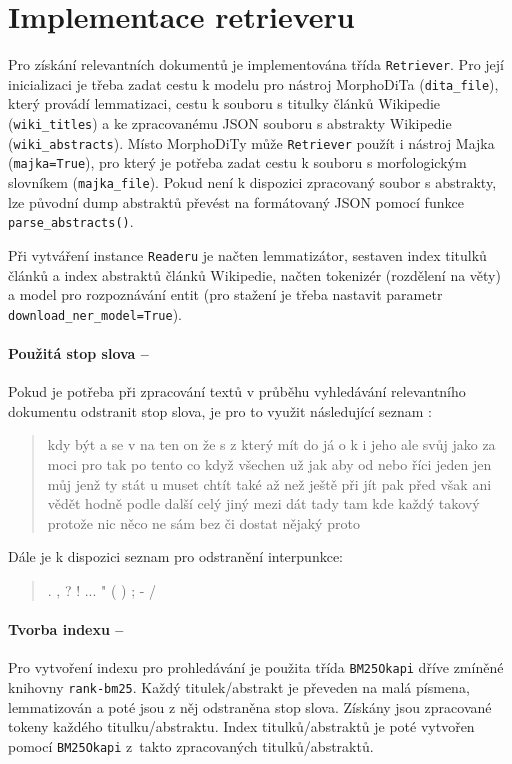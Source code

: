 \section{Implementace retrieveru}
\label{retriever_imp}
Pro získání relevantních dokumentů je implementována třída \texttt{Retriever}. Pro její inicializaci je třeba zadat cestu k modelu pro nástroj MorphoDiTa (\texttt{dita\_file}), který provádí lemmatizaci, cestu k souboru s titulky článků Wikipedie (\texttt{wiki\_titles}) a ke zpracovanému JSON souboru s abstrakty Wikipedie (\texttt{wiki\_abstracts}). Místo MorphoDiTy může \texttt{Retriever} použít i nástroj Majka (\texttt{majka=True}), pro který je potřeba zadat cestu k souboru s morfologickým slovníkem (\texttt{majka\_file}). Pokud není k dispozici zpracovaný soubor s abstrakty, lze původní dump abstraktů převést na formátovaný JSON pomocí funkce \texttt{parse\_abstracts()}.\par
Při vytváření instance \texttt{Readeru} je načten lemmatizátor, sestaven index titulků článků a index abstraktů článků Wikipedie, načten tokenizér (rozdělení na věty) a model pro rozpoznávání entit (pro stažení je třeba nastavit parametr \texttt{download\_ner\_model=True}).\par

\paragraph{Použitá stop slova --}
Pokud je potřeba při zpracování textů v průběhu vyhledávání relevantního dokumentu odstranit stop slova, je pro to využit následující seznam \cite{wiki:frekv}:
\begin{quote}
    {\footnotesize kdy být a se v na ten on že s z který mít do já o k i jeho ale svůj jako za moci pro tak po tento co když všechen už jak aby od nebo říci jeden jen můj jenž ty stát u muset chtít také až než ještě při jít pak před však ani vědět hodně podle další celý jiný mezi dát tady tam kde každý takový protože nic něco ne sám bez či dostat nějaký proto}
\end{quote}
Dále je k dispozici seznam pro odstranění interpunkce:
\begin{quote}
    {\footnotesize . , ? ! ... " ( ) ; - /}
\end{quote}

\paragraph{Tvorba indexu --}
Pro vytvoření indexu pro prohledávání je použita třída \texttt{BM25Okapi} dříve zmíněné knihovny \texttt{rank-bm25}. Každý titulek/abstrakt je převeden na malá písmena, lemmatizován a poté jsou z něj odstraněna stop slova. Získány jsou zpracované tokeny každého titulku/abstraktu. Index titulků/abstraktů je poté vytvořen pomocí \texttt{BM25Okapi} z~takto zpracovaných titulků/abstraktů.

